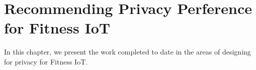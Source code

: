 \chapter{Recommending Privacy Perference for Fitness IoT}
In this chapter, we present the work completed to date in the areas of designing for privacy for Fitness IoT.